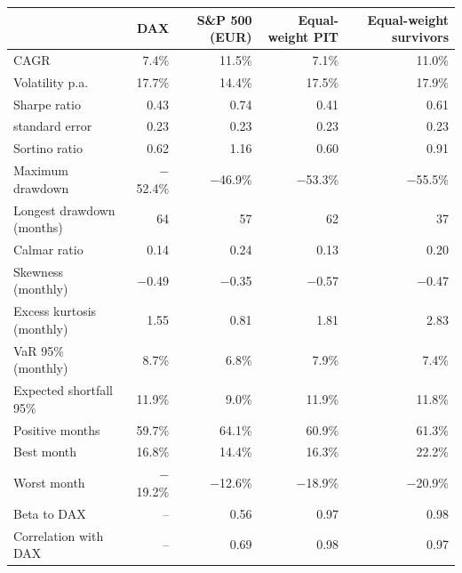 \begin{tabular}{lrrrr}
\toprule
 & DAX & S\&P 500 (EUR) & Equal-weight PIT & Equal-weight survivors \\
\midrule
CAGR & 7.4\% & 11.5\% & 7.1\% & 11.0\% \\
Volatility p.a. & 17.7\% & 14.4\% & 17.5\% & 17.9\% \\
Sharpe ratio & 0.43 & 0.74 & 0.41 & 0.61 \\
\quad standard error & 0.23 & 0.23 & 0.23 & 0.23 \\
Sortino ratio & 0.62 & 1.16 & 0.60 & 0.91 \\
\midrule
Maximum drawdown & $-$52.4\% & $-$46.9\% & $-$53.3\% & $-$55.5\% \\
Longest drawdown (months) & 64 & 57 & 62 & 37 \\
Calmar ratio & 0.14 & 0.24 & 0.13 & 0.20 \\
\midrule
Skewness (monthly) & $-$0.49 & $-$0.35 & $-$0.57 & $-$0.47 \\
Excess kurtosis (monthly) & 1.55 & 0.81 & 1.81 & 2.83 \\
VaR 95\% (monthly) & 8.7\% & 6.8\% & 7.9\% & 7.4\% \\
Expected shortfall 95\% & 11.9\% & 9.0\% & 11.9\% & 11.8\% \\
\midrule
Positive months & 59.7\% & 64.1\% & 60.9\% & 61.3\% \\
Best month & 16.8\% & 14.4\% & 16.3\% & 22.2\% \\
Worst month & $-$19.2\% & $-$12.6\% & $-$18.9\% & $-$20.9\% \\
\midrule
Beta to DAX & -- & 0.56 & 0.97 & 0.98 \\
Correlation with DAX & -- & 0.69 & 0.98 & 0.97 \\
\bottomrule
\end{tabular}
